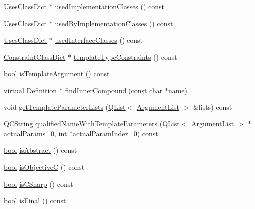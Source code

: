 \begin{DoxyCompactItemize}
\item 
\hyperlink{class_uses_class_dict}{Uses\+Class\+Dict} $\ast$ \hyperlink{class_class_def_acea3f6cb4ead17d9505781ad95b76561}{used\+Implementation\+Classes} () const 
\item 
\hyperlink{class_uses_class_dict}{Uses\+Class\+Dict} $\ast$ \hyperlink{class_class_def_a9ff8c21d176c037b190f43b1d4c74c34}{used\+By\+Implementation\+Classes} () const 
\item 
\hyperlink{class_uses_class_dict}{Uses\+Class\+Dict} $\ast$ \hyperlink{class_class_def_ab1eb2d9a4a1ccfc25856fd3fb4408653}{used\+Interface\+Classes} () const 
\item 
\hyperlink{class_constraint_class_dict}{Constraint\+Class\+Dict} $\ast$ \hyperlink{class_class_def_a608f3fab0467d693c12fd7fe491a53ad}{template\+Type\+Constraints} () const 
\item 
\hyperlink{qglobal_8h_a1062901a7428fdd9c7f180f5e01ea056}{bool} \hyperlink{class_class_def_af26a638a137c7947436a99e1fa5fa80d}{is\+Template\+Argument} () const 
\item 
virtual \hyperlink{class_definition}{Definition} $\ast$ \hyperlink{class_class_def_a8db8d33eed72681a51d5db1dca87cfac}{find\+Inner\+Compound} (const char $\ast$\hyperlink{class_definition_a99481361779e85f0c1556709de7d9e5b}{name})
\item 
void \hyperlink{class_class_def_a6f188c06597898555fac6353ce0d512b}{get\+Template\+Parameter\+Lists} (\hyperlink{class_q_list}{Q\+List}$<$ \hyperlink{class_argument_list}{Argument\+List} $>$ \&lists) const 
\item 
\hyperlink{class_q_c_string}{Q\+C\+String} \hyperlink{class_class_def_ada05aa6d5009d51d21b6ed9a9cf413ea}{qualified\+Name\+With\+Template\+Parameters} (\hyperlink{class_q_list}{Q\+List}$<$ \hyperlink{class_argument_list}{Argument\+List} $>$ $\ast$actual\+Params=0, int $\ast$actual\+Param\+Index=0) const 
\item 
\hyperlink{qglobal_8h_a1062901a7428fdd9c7f180f5e01ea056}{bool} \hyperlink{class_class_def_a6e1db35ca778a17572eb23ff9244a1b2}{is\+Abstract} () const 
\item 
\hyperlink{qglobal_8h_a1062901a7428fdd9c7f180f5e01ea056}{bool} \hyperlink{class_class_def_ae9142dc99d3dfd86492e4055e52ae003}{is\+Objective\+C} () const 
\item 
\hyperlink{qglobal_8h_a1062901a7428fdd9c7f180f5e01ea056}{bool} \hyperlink{class_class_def_a5d2fd562edd7ea2cbea161c5eecfaeb4}{is\+C\+Sharp} () const 
\item 
\hyperlink{qglobal_8h_a1062901a7428fdd9c7f180f5e01ea056}{bool} \hyperlink{class_class_def_a5bbd60a000da2515c0a63049ede56e88}{is\+Final} () const 

\end{DoxyCompactItemize}

